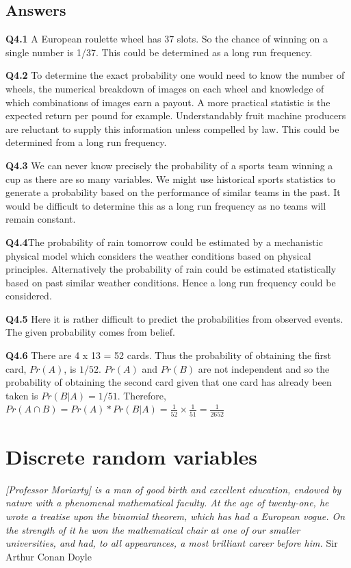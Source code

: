 \documentclass[
  oneside]{krantz}
\begin{document}
\hypertarget{ANSprob}{%
\section{Answers}\label{ANSprob}}

\textbf{Q4.1} A European roulette wheel has 37 slots. So the chance of winning on a single number is 1/37. This could be determined as a long run frequency.

\textbf{Q4.2} To determine the exact probability one would need to know the number of wheels, the numerical breakdown of images on each wheel and knowledge of which combinations of images earn a payout. A more practical statistic is the expected return per pound for example. Understandably fruit machine producers are reluctant to supply this information unless compelled by law. This could be determined from a long run frequency.

\textbf{Q4.3} We can never know precisely the probability of a sports team winning a cup as there are so many variables. We might use historical sports statistics to generate a probability based on the performance of similar teams in the past. It would be difficult to determine this as a long run frequency as no teams will remain constant.

\textbf{Q4.4}The probability of rain tomorrow could be estimated by a mechanistic physical model which considers the weather conditions based on physical principles. Alternatively the probability of rain could be estimated statistically based on past similar weather conditions. Hence a long run frequency could be considered.

\textbf{Q4.5} Here it is rather difficult to predict the probabilities from observed events. The given probability comes from belief.

\textbf{Q4.6} There are 4 x 13 = 52 cards. Thus the probability of obtaining the first card, \(Pr(A)\), is \(1/52\). \(Pr(A)\) and \(Pr(B)\) are not independent and so the probability of obtaining the second card given that one card has already been taken is \(Pr(B|A) = 1/51\). Therefore, \(Pr(A \cap B) = Pr(A) * Pr(B | A) = \frac{1}{52} \times \frac{1}{51} = \frac{1}{2652}\)

\hypertarget{discreterv}{%
\chapter{Discrete random variables}\label{discreterv}}

\emph{{[}Professor Moriarty{]} is a man of good birth and excellent education, endowed by nature with a phenomenal mathematical faculty. At the age of twenty-one, he wrote a treatise upon the binomial theorem, which has had a European vogue. On the strength of it he won the mathematical chair at one of our smaller universities, and had, to all appearances, a most brilliant career before him.} Sir Arthur Conan Doyle \citeyearpar{Doyle1894}
\end{document}
